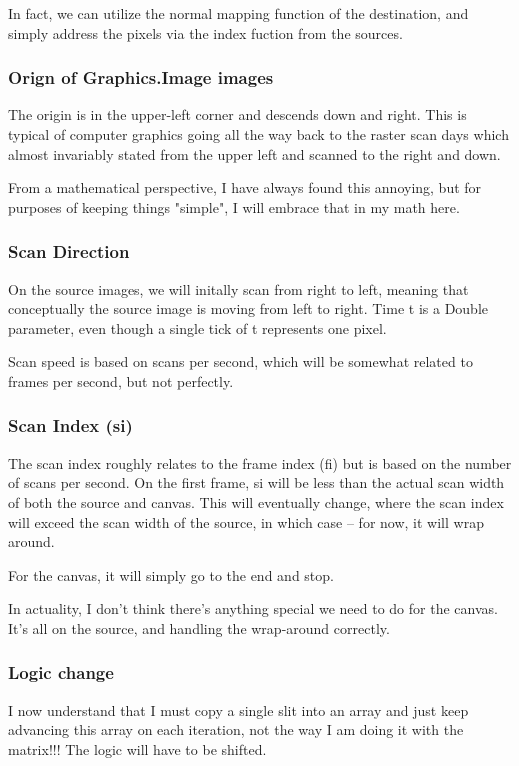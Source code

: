 \documentclass[letterpaper, 11pt]{article}
\begin{document}
In fact, we can utilize the normal mapping function of the destination, and 
simply address the pixels via the index fuction from the sources.

\subsubsection{Orign of Graphics.Image images}
\label{sec:org1fa11df}
The origin is in the upper-left corner and descends down and right.
This is typical of computer graphics going all the way back to the raster scan
days which almost invariably stated from the upper left and scanned to the
right and down.

From a mathematical perspective, I have always found this annoying, but for
purposes of keeping things "simple", I will embrace that in my math here.
\subsubsection{Scan Direction}
\label{sec:org6be1ef2}
On the source images, we will initally scan from right to left, meaning that
conceptually the source image is moving from left to right. Time t is a Double
parameter, even though a single tick of t represents one pixel.

Scan speed is based on scans per second, which will be somewhat related to 
frames per second, but not perfectly.

\subsubsection{Scan Index (si)}
\label{sec:org5b04d6b}
The scan index roughly relates to the frame index (fi) but is based
on the number of scans per second. On the first frame, si will be less than 
the actual scan width of both the source and canvas. This will eventually change,
where the scan index will exceed the scan width of the source, in which
case -- for now, it will wrap around.

For the canvas, it will simply go to the end and stop.

In actuality, I don't think there's anything special we need to do for the
canvas. It's all on the source, and handling the wrap-around correctly.
\subsubsection{Logic change}
\label{sec:org92947a4}
I now understand that I must copy a single slit into an array and just 
keep advancing this array on each iteration, not the way I am doing 
it with the matrix!!! The logic will have to be shifted.
\end{document}
